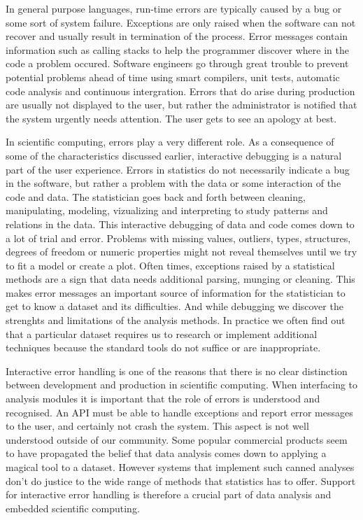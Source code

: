 In general purpose languages, run-time errors are typically caused by a bug or some sort of system failure. Exceptions are only raised when the software can not recover and usually result in termination of the process. Error messages contain information such as calling stacks to help the programmer discover where in the code a problem occured. Software engineers go through great trouble to prevent potential problems ahead of time using smart compilers, unit tests, automatic code analysis and continuous intergration. Errors that do arise during production are usually not displayed to the user, but rather the administrator is notified that the system urgently needs attention. The user gets to see an apology at best.

In scientific computing, errors play a very different role. As a consequence of some of the characteristics discussed earlier, interactive debugging is a natural part of the user experience. Errors in statistics do not necessarily indicate a bug in the software, but rather a problem with the data or some interaction of the code and data. The statistician goes back and forth between cleaning, manipulating, modeling, vizualizing and interpreting to study patterns and relations in the data. This interactive debugging of data and code comes down to a lot of trial and error. Problems with missing values, outliers, types, structures, degrees of freedom or numeric properties might not reveal themselves until we try to fit a model or create a plot. Often times, exceptions raised by a statistical methods are a sign that data needs additional parsing, munging or cleaning. This makes error messages an important source of information for the statistician to get to know a dataset and its difficulties. And while debugging we discover the strenghts and limitations of the analysis methods. In practice we often find out that a particular dataset requires us to research or implement additional techniques because the standard tools do not suffice or are inappropriate.

Interactive error handling is one of the reasons that there is no clear distinction between development and production in scientific computing. When interfacing to analysis modules it is important that the role of errors is understood and recognised. An API must be able to handle exceptions and report error messages to the user, and certainly not crash the system. This aspect is not well understood outside of our community. Some popular commercial products seem to have propagated the belief that data analysis comes down to applying a magical tool to a dataset. However systems that implement such canned analyses don't do justice to the wide range of methods that statistics has to offer. Support for interactive error handling is therefore a crucial part of data analysis and embedded scientific computing.



